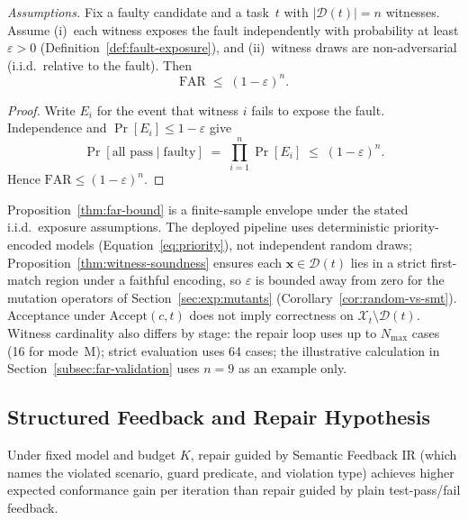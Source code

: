 \begin{proposition}
\label{thm:far-bound}
\emph{Assumptions.}
Fix a faulty candidate and a task~$t$ with $|\mathcal{D}(t)|=n$ witnesses.
Assume (i)~each witness exposes the fault independently with probability at
least $\varepsilon>0$ (Definition~\ref{def:fault-exposure}), and
(ii)~witness draws are non-adversarial (i.i.d.\ relative to the fault).
Then
\[
  \mathrm{FAR} \;\leq\; (1-\varepsilon)^n.
\]
\end{proposition}
\begin{proof}
Write $E_i$ for the event that witness $i$ fails to expose the fault.
Independence and $\Pr[E_i]\le 1-\varepsilon$ give
\[
  \Pr[\text{all pass}\mid\text{faulty}]
  \;=\; \prod_{i=1}^{n}\Pr[E_i]
  \;\le\; (1-\varepsilon)^n.
\]
Hence $\mathrm{FAR}\le(1-\varepsilon)^n$.
\end{proof}

\begin{remark}
\label{rem:far-bound-scope}
Proposition~\ref{thm:far-bound} is a finite-sample envelope under the stated
i.i.d.\ exposure assumptions.
The deployed pipeline uses deterministic priority-encoded models
(Equation~\eqref{eq:priority}), not independent random draws; Proposition~\ref{thm:witness-soundness}
ensures each $\mathbf{x}\in\mathcal{D}(t)$ lies in a strict first-match region
under a faithful encoding, so $\varepsilon$ is bounded away from zero for the
mutation operators of Section~\ref{sec:exp:mutants}
(Corollary~\ref{cor:random-vs-smt}).
Acceptance under $\mathrm{Accept}(c,t)$ does not imply correctness on
$\mathcal{X}_t\setminus\mathcal{D}(t)$.
Witness cardinality also differs by stage: the repair loop uses up to
$N_{\max}$ cases (16 for mode~M); strict evaluation uses 64 cases; the
illustrative calculation in Section~\ref{subsec:far-validation} uses $n{=}9$
as an example only.
\end{remark}

\subsection{Structured Feedback and Repair Hypothesis}
\label{subsec:repair-monotonicity}

\begin{hypothesis}
\label{hyp:structured-feedback}
Under fixed model and budget $K$, repair guided by Semantic Feedback IR
(which names the violated scenario, guard predicate, and violation type)
achieves higher expected conformance gain per iteration than repair guided
by plain test-pass/fail feedback.
\end{hypothesis}

